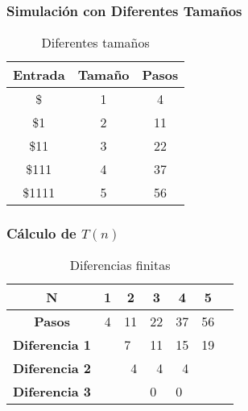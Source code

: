\documentclass{uc3mpracticas}
\begin{document}
  \subsubsection{Simulación con Diferentes Tamaños}
  \begin{table}[!h]
    \centering
  \begin{tabular}{|c|c|c|}
  \hline
  \textbf{Entrada} & \textbf{Tamaño} & \textbf{Pasos} \\ \hline
  \$               & 1               & 4              \\ \hline
  \$1              & 2               & 11             \\ \hline
  \$11             & 3               & 22             \\ \hline
  \$111            & 4               & 37             \\ \hline
  \$1111           & 5               & 56             \\ \hline
  \end{tabular}
  \caption{Diferentes tamaños}
  \end{table}


  \subsubsection{Cálculo de $T(n)$}

  \begin{table}[!h]
    \centering
    \begin{tabular}{|c|p{1cm}|p{1cm}|p{1cm}|p{1cm}|p{1cm}|p{1cm}|}
  \hline
  \textbf{N}     & \multicolumn{1}{c|}{\textbf{1}} & \multicolumn{1}{c|}{\textbf{2}} & \multicolumn{1}{c|}{\textbf{3}} & \multicolumn{1}{c|}{\textbf{4}} & \multicolumn{1}{c|}{\textbf{5}} \\ \hline
  \textbf{Pasos} & \multicolumn{1}{c|}{4}          & \multicolumn{1}{c|}{11}         & \multicolumn{1}{c|}{22}         & \multicolumn{1}{c|}{37}         & \multicolumn{1}{c|}{56}         \\ \hline
  \textbf{Diferencia 1}                  &                                                         & 7                                                       & 11                              & 15                              & 19                              \\ \hline
  \textbf{Diferencia 2}                  &                                                         & \multicolumn{1}{r|}{4}                                  & \multicolumn{1}{r|}{4}          & \multicolumn{1}{r|}{4}          &                                 \\ \hline
  \textbf{Diferencia 3}                  &                                                         &                                                         & 0                               & 0                               &                                 \\ \hline
  \end{tabular}
  \caption{Diferencias finitas}
  \end{table}
\end{document}

